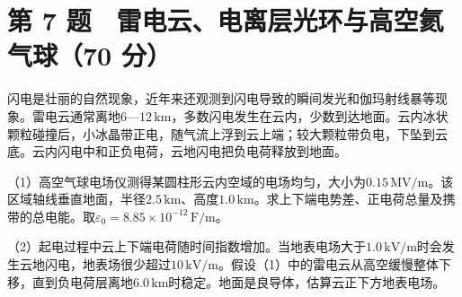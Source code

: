 \documentclass[12pt,a4paper,fontset=fandol]{ctexart}
\begin{document}
\clearpage

\section{第 7 题　雷电云、电离层光环与高空氦气球（70
分）}\label{ux7b2c-7-ux9898-ux96f7ux7535ux4e91ux7535ux79bbux5c42ux5149ux73afux4e0eux9ad8ux7a7aux6c26ux6c14ux740370-ux5206}

闪电是壮丽的自然现象，近年来还观测到闪电导致的瞬间发光和伽玛射线暴等现象。雷电云通常离地\(6\)---\(12\,\mathrm{km}\)，多数闪电发生在云内，少数到达地面。云内冰状颗粒碰撞后，小冰晶带正电，随气流上浮到云上端；较大颗粒带负电，下坠到云底。云内闪电中和正负电荷，云地闪电把负电荷释放到地面。

\begin{center}
\begin{minipage}{\linewidth}
\centering\begingroup{}
\ifdim\wd\diagrambox>.88\linewidth
\sbox{\diagrambox}{\resizebox{.88\linewidth}{!}{\usebox{\diagrambox}}}\fi
\ifdim\ht\diagrambox>.38\textheight
\resizebox{!}{.38\textheight}{\usebox{\diagrambox}}
\else\usebox{\diagrambox}\fi
\par{}\endgroup\end{minipage}\end{center}

（1）高空气球电场仪测得某圆柱形云内空域的电场均匀，大小为\(0.15\,\mathrm{MV/m}\)。该区域轴线垂直地面，半径\(2.5\,\mathrm{km}\)、高度\(1.0\,\mathrm{km}\)。求上下端电势差、正电荷总量及携带的总电能。取\(\varepsilon_0=8.85\times10^{-12}\,\mathrm{F/m}\)。

（2）起电过程中云上下端电荷随时间指数增加。当地表电场大于\(1.0\,\mathrm{kV/m}\)时会发生云地闪电，地表场很少超过\(10\,\mathrm{kV/m}\)。假设（1）中的雷电云从高空缓慢整体下移，直到负电荷层离地\(6.0\,\mathrm{km}\)时稳定。地面是良导体，估算云正下方地表电场。
\end{document}
